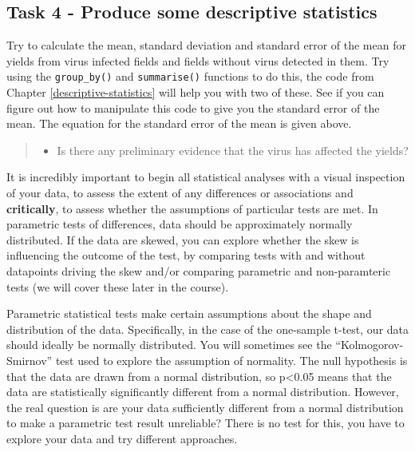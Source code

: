 \documentclass[
]{book}
\providecommand{\tightlist}{%
  \setlength{\itemsep}{0pt}\setlength{\parskip}{0pt}}
\begin{document}
\hypertarget{task-4---produce-some-descriptive-statistics}{%
\subsection{Task 4 - Produce some descriptive statistics}\label{task-4---produce-some-descriptive-statistics}}

Try to calculate the mean, standard deviation and standard error of the mean for yields from virus infected fields and fields without virus detected in them. Try using the \texttt{group\_by()} and \texttt{summarise()} functions to do this, the code from Chapter \ref{descriptive-statistics} will help you with two of these. See if you can figure out how to manipulate this code to give you the standard error of the mean. The equation for the standard error of the mean is given above.

\begin{quote}
\begin{itemize}
\tightlist
\item
  Is there any preliminary evidence that the virus has affected the yields?
\end{itemize}
\end{quote}

It is incredibly important to begin all statistical analyses with a visual inspection of your data, to assess the extent of any differences or associations and \textbf{critically}, to assess whether the assumptions of particular tests are met. In parametric tests of differences, data should be approximately normally distributed. If the data are skewed, you can explore whether the skew is influencing the outcome of the test, by comparing tests with and without datapoints driving the skew and/or comparing parametric and non-paramteric tests (we will cover these later in the course).

Parametric statistical tests make certain assumptions about the shape and distribution of the data. Specifically, in the case of the one-sample t-test, our data should ideally be normally distributed. You will sometimes see the ``Kolmogorov-Smirnov'' test used to explore the assumption of normality. The null hypothesis is that the data are drawn from a normal distribution, so p\textless0.05 means that the data are statistically significantly different from a normal distribution. However, the real question is are your data sufficiently different from a normal distribution to make a parametric test result unreliable? There is no test for this, you have to explore your data and try different approaches.
\end{document}
